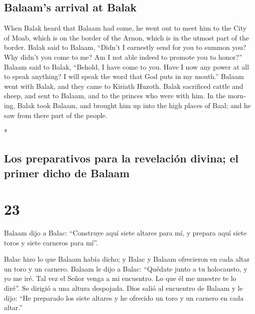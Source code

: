 \begin{paracol}{2}
\begin{otherlanguage}{english}
\hypertarget{balaams-arrival-at-balak}{%
\subsection{Balaam's arrival at Balak}\label{balaams-arrival-at-balak}}

 When Balak heard that Balaam had come, he went out to
meet him to the City of Moab, which is on the border of the Arnon, which
is in the utmost part of the border.  Balak said to
Balaam, ``Didn't I earnestly send for you to summon you? Why didn't you
come to me? Am I not able indeed to promote you to honor?''
 Balaam said to Balak, ``Behold, I have come to you. Have
I now any power at all to speak anything? I will speak the word that God
puts in my mouth.''  Balaam went with Balak, and they
came to Kiriath Huzoth.  Balak sacrificed cattle and
sheep, and sent to Balaam, and to the princes who were with him.
 In the morning, Balak took Balaam, and brought him up
into the high places of Baal; and he saw from there part of the people.

\end{otherlanguage}

\switchcolumn[0]*

\hypertarget{los-preparativos-para-la-revelaciuxf3n-divina-el-primer-dicho-de-balaam}{%
\subsection{Los preparativos para la revelación divina; el primer dicho
de
Balaam}\label{los-preparativos-para-la-revelaciuxf3n-divina-el-primer-dicho-de-balaam}}

\hypertarget{section-44}{%
\section{23}\label{section-44}}

 Balaam dijo a Balac: ``Construye aquí siete altares para
mí, y prepara aquí siete toros y siete carneros para mí''.

 Balac hizo lo que Balaam había dicho; y Balac y Balaam
ofrecieron en cada altar un toro y un carnero.  Balaam le
dijo a Balac: ``Quédate junto a tu holocausto, y yo me iré. Tal vez el
Señor venga a mi encuentro. Lo que él me muestre te lo diré''. Se
dirigió a una altura despojada.  Dios salió al encuentro
de Balaam y le dijo: ``He preparado los siete altares y he ofrecido un
toro y un carnero en cada altar.''


\end{paracol}

